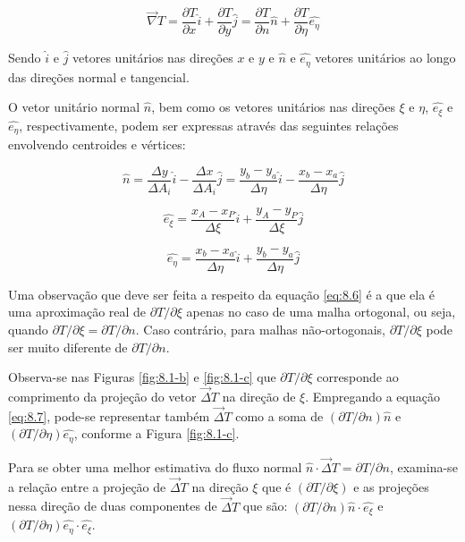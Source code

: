 \begin{equation}
    \label{eq:8.7}
    \vec{\nabla}T = \frac{\partial T}{\partial x}\hat{i} + \frac{\partial T}{\partial y}\hat{j} = \frac{\partial T}{\partial n}\hat{n} + \frac{\partial T}{\partial \eta}\hat{e_\eta}
\end{equation}

Sendo $\hat{i}$ e $\hat{j}$ vetores unitários nas direções $x$ e $y$ e $\hat{n}$ e $\hat{e_\eta}$ vetores unitários ao longo das direções normal e tangencial.

O vetor unitário normal $\hat{n}$, bem como os vetores unitários nas direções $\xi$ e $\eta$, $\hat{e_\xi}$ e $\hat{e_\eta}$, respectivamente, podem ser expressas através das seguintes relações envolvendo centroides e vértices:

\begin{equation}
    \label{eq:8.8}
    \hat{n} = \frac{\Delta y}{\Delta A_i}\hat{i} - \frac{\Delta x}{\Delta A_i}\hat{j} = \frac{y_b - y_a}{\Delta \eta}\hat{i} - \frac{x_b - x_a}{\Delta \eta}\hat{j}
\end{equation}

\begin{equation}
    \label{eq:8.9}
    \hat{e_\xi} = \frac{x_A - x_P}{\Delta \xi}\hat{i} + \frac{y_A - y_P}{\Delta \xi}\hat{j}
\end{equation}

\begin{equation}
    \label{eq:8.10}
    \hat{e_\eta} = \frac{x_b - x_a}{\Delta \eta}\hat{i} + \frac{y_b - y_a}{\Delta \eta}\hat{j}
\end{equation}

Uma observação que deve ser feita a respeito da equação \ref{eq:8.6} é a que ela é uma aproximação real de $\partial T/\partial \xi$ apenas no caso de uma malha ortogonal, ou seja, quando $\partial T/\partial \xi = \partial T/\partial n$. Caso contrário, para malhas não-ortogonais, $\partial T/\partial \xi$ pode ser muito diferente de $\partial T/\partial n$.

Observa-se nas Figuras \ref{fig:8.1-b} e \ref{fig:8.1-c} que $\partial T/\partial \xi$ corresponde ao comprimento da projeção do vetor $\vec{\Delta}T$ na direção de $\xi$. Empregando a equação \ref{eq:8.7}, pode-se representar também $\vec{\Delta}T$ como a soma de $(\partial T/\partial n)\hat{n}$ e $(\partial T/\partial \eta)\hat{e_\eta}$, conforme a Figura \ref{fig:8.1-c}.

Para se obter uma melhor estimativa do fluxo normal $\hat{n} \cdot \vec{\Delta}T = \partial T/\partial n$, examina-se a relação entre a projeção de $\vec{\Delta}T$ na direção $\xi$ que é $(\partial T/\partial \xi)$ e as projeções nessa direção de duas componentes de $\vec{\Delta}T$ que são: $(\partial T/\partial n)\hat{n} \cdot \hat{e_\xi}$ e $(\partial T/\partial \eta)\hat{e_\eta} \cdot \hat{e_\xi}$.

